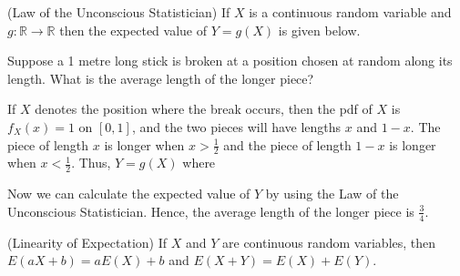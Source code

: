\begin{thm}(Law of the Unconscious Statistician)\label{ConLOTUS} If $X$ is a continuous random variable and $g:\mathbb{R} \to \mathbb{R}$ then the expected value of $Y = g(X)$ is given below.
\end{thm}

\begin{examp}Suppose a 1 metre long stick is broken at a position chosen at random along its length. What is the average length of the longer piece?
\par
\noindent If $X$ denotes the position where the break occurs, then the pdf of $X$ is $f_X(x) = 1$ on $[0,1]$, and the two pieces will have lengths $x$ and $1-x$. The piece of length $x$ is longer when $x > \frac{1}{2}$ and the piece of length $1-x$ is longer when $x < \frac{1}{2}$. Thus, $Y = g(X)$ where
\renewcommand*{\arraystretch}{1.35}
\renewcommand*{\arraystretch}{1}
\par
\noindent Now we can calculate the expected value of $Y$ by using the Law of the Unconscious Statistician.
Hence, the average length of the longer piece is $\frac{3}{4}$.
\end{examp}
\vspace{0.1em}
\begin{prop}(Linearity of Expectation) If $X$ and $Y$ are continuous random variables, then $E(aX+b) = aE(X)+b$ and $E(X+Y) = E(X)+E(Y)$.
\end{prop}
